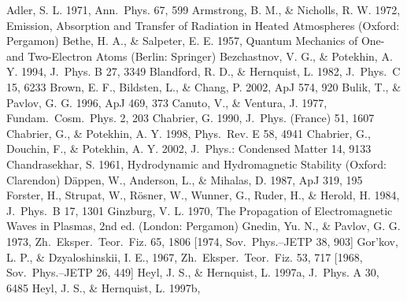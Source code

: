 \documentclass{emulateapj}
\begin{document}
\begin{thebibliography}{} 

Adler, S. L. 1971, Ann.\ Phys. 67, 599
%
Armstrong, B. M., \& Nicholls, R. W. 1972,
Emission, Absorption and Transfer of Radiation in Heated Atmospheres
      (Oxford: Pergamon)
%
Bethe, H. A., \& Salpeter, E. E. 1957,
Quantum Mechanics of One- and Two-Electron Atoms
       (Berlin: Springer)
%
 Bezchastnov, V. G., \& Potekhin, A. Y. 1994,
 J.\ Phys. B 27, 3349
%
Blandford, R. D., \& Hernquist, L. 1982,
J.\ Phys.\ C 15, 6233
%
Brown, E. F., Bildsten, L., \& Chang, P. 2002,
ApJ 574, 920
%
Bulik, T., \& Pavlov, G. G. 1996,
ApJ 469, 373
%
Canuto, V., \& Ventura, J. 1977,
Fundam.\ Cosm.\ Phys. 2, 203
%
Chabrier, G. 1990,
J.\ Phys. (France) 51, 1607
%
Chabrier, G., \& Potekhin, A. Y. 1998,
Phys.\ Rev. E 58, 4941
%
Chabrier, G., Douchin, F., \& Potekhin, A. Y. 2002,
J.\ Phys.: Condensed Matter 14, 9133
%
Chandrasekhar, S. 1961, Hydrodynamic and Hydromagnetic Stability (Oxford: Clarendon)
%
D\"appen, W., Anderson, L., \& Mihalas, D. 1987,
ApJ 319, 195
%
Forster, H., Strupat, W., R\"osner, W.,
Wunner, G., Ruder, H., \& Herold, H. 1984,
J.\ Phys.\ B 17, 1301
%
Ginzburg, V. L. 1970,
The Propagation of Electromagnetic Waves in Plasmas,
2nd ed. 
        (London: Pergamon)
%
Gnedin, Yu. N., \& Pavlov, G. G. 1973,
Zh.\ Eksper.\ Teor.\ Fiz. 65, 1806
[1974, Sov.\ Phys.--JETP 38, 903]
%
Gor'kov, L. P., \& Dzyaloshinskii, I. E., 1967,
Zh.\ Eksper.\ Teor.\ Fiz. 53, 717 
[1968, Sov.\ Phys.--JETP 26, 449]
%
Heyl, J. S., \& Hernquist, L. 1997a,
J.\ Phys. A 30, 6485
%
Heyl, J. S., \& Hernquist, L. 1997b,

\end{thebibliography}
\end{document}
